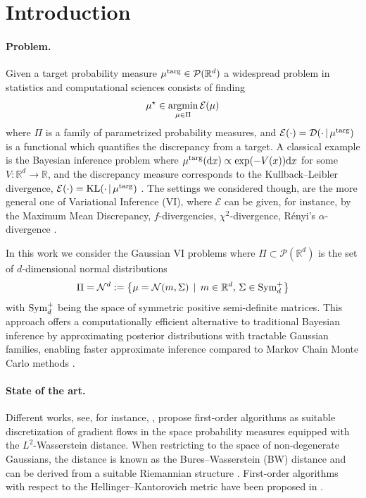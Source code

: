 \documentclass{article}
\theoremstyle{plain}
\theoremstyle{definition}
\theoremstyle{remark}
\newcommand{\Rd}{ {\mathbb{R}^d}}
\newcommand{\R}{ \mathbb{R}}
\newcommand{\E}{\mathcal{E}}
\renewcommand{\d}{\mathrm{d}}
\newcommand{\argmin}{\textup{argmin}}
\newcommand{\psd}{\textup{Sym}^{+}_d}
\newcommand{\KL}{\textup{KL}}
\newcommand{\targ}{\textup{targ}}
\begin{document}
\section{Introduction}

\paragraph{Problem.} Given a target probability measure $\mu^\targ \in \mathcal{P}(\Rd)$ a widespread problem in statistics and computational sciences consists of finding
\begin{equation} \label{eq:pb}
\mu^\star \in \underset{\mu\in \Pi}{\argmin} \, \E(\mu)
\end{equation}
where $\Pi$ is a family of parametrized probability measures, and $\E(\cdot) = \mathcal{D}(\cdot\,|\,\mu^\targ)$ is a functional which quantifies the discrepancy from a target. A classical example is the Bayesian inference problem where $\mu^\targ(\d x)\propto \exp(-V(x))\d x$ for some $V:\Rd \to \R$, and the discrepancy measure corresponds to the Kullback--Leibler divergence, $\E(\cdot) = \KL(\cdot\,|\,\mu^\targ)$ \cite{blei2017review}. The settings we considered though, are the more general one of Variational Inference (VI), where $\E$ can be given, for instance, by the  Maximum Mean Discrepancy, $f$-divergencies, $\chi^2$-divergence, R{\'e}nyi’s $\alpha$-divergence  \cite{blei2017review,knoblauch2022}.  

In this work we consider the 
Gaussian VI problems \cite{diao2023forward,katsevich2024approximation} where $\Pi\subset\mathcal{P}(\Rd)$ is the set of $d$-dimensional normal distributions
\[
\Pi = \mathcal{N}^d := \left\{\mu = \mathcal{N}(m,\Sigma) \,\mid \,m\in \Rd,\, \Sigma\in \psd \right\}
  \]
 with $\psd$ being the space of symmetric positive semi-definite matrices. This approach offers a computationally efficient alternative to traditional Bayesian inference by approximating posterior distributions with tractable Gaussian families, enabling faster approximate inference compared to Markov Chain Monte Carlo methods \cite{spokoiny2025gaussian,katsevich2024approximation}.

\paragraph{State of the art.}
Different works, see, for  instance,  \cite{alvarez2022optimizing, lambert2022variational,diao2023forward},  propose first-order algorithms  as suitable discretization of gradient flows  in the space probability measures \cite{ags2008} equipped with the $L^2$-Wasserstein distance.
When restricting to the space of non-degenerate Gaussians, the distance is known as the Bures--Wasserstein (BW) distance and can be derived from a suitable Riemannian structure \cite{bathia2019,Malago2018}. First-order algorithms with respect  to the Hellinger--Kantorovich  metric have been proposed in \cite{tse2025hk}. 
\end{document}
